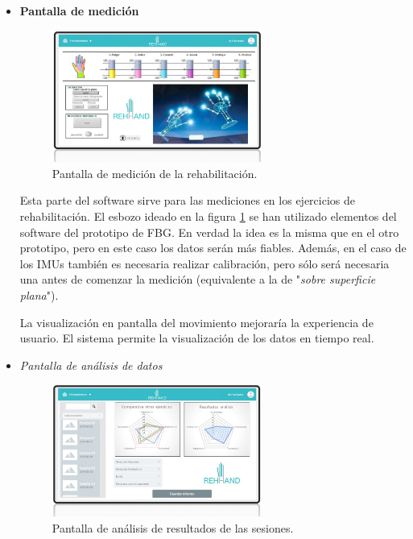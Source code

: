 \begin{itemize}
	\item \textbf{Pantalla de medición}
	
	\begin{figure}[H]
		\centering
		\includegraphics[width=0.65\textwidth]{./img/softwareIMU1}
		\caption{Pantalla de medición de la rehabilitación. } 
		\label{fig:softIMU1}
	\end{figure} 
	 
	 Esta parte del software sirve para las mediciones en los ejercicios de rehabilitación. El esbozo ideado en la figura \ref{fig:softIMU1} se han utilizado elementos del software del prototipo de FBG. En verdad la idea es la misma que en el otro prototipo, pero en este caso los datos serán más fiables. Además, en el caso de los IMUs también es necesaria realizar calibración, pero sólo será necesaria una antes de comenzar la medición (equivalente a la de "\textit{sobre superficie plana}").
	 
	 La visualización en pantalla del movimiento mejoraría la experiencia de usuario. El sistema permite la visualización de los datos en tiempo real.
	
	\item \textit{Pantalla de análisis de datos}
	
	\begin{figure}[H]
		\centering
		\includegraphics[width=0.65\textwidth]{./img/softwareIMU2}
		\caption{Pantalla de análisis de resultados de las sesiones. } 
		\label{fig:softIMU2}
	\end{figure} 
	

\end{itemize}
